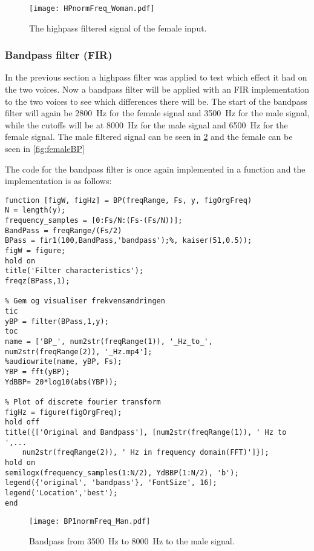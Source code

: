 \begin{figure}[h]
	\centering
	\texttt{[image: HPnormFreq\_Woman.pdf]}
	\caption{The highpass filtered signal of the female input.}
	\label{fig:HPFemale}
\end{figure}

\clearpage

\subsubsection{Bandpass filter (FIR)}
\label{sec:Bandpass}
In the previous section a highpass filter was applied to test which effect it had on the two voices. Now a bandpass filter will be applied with an FIR implementation to the two voices to see which differences there will be. The start of the bandpass filter will again be \SI{2800}{\hertz} for the female signal and \SI{3500}{\hertz} for the male signal, while the cutoffs will be at \SI{8000}{\hertz} for the male signal and \SI{6500}{\hertz} for the female signal. The male filtered signal can be seen in \cref{fig:maleBP} and the female can be seen in \cref{fig:femaleBP}

The code for the bandpass filter is once again implemented in a function and the implementation is as follows:

\begin{verbatim}
function [figW, figHz] = BP(freqRange, Fs, y, figOrgFreq)
N = length(y);
frequency_samples = [0:Fs/N:(Fs-(Fs/N))];
BandPass = freqRange/(Fs/2)
BPass = fir1(100,BandPass,'bandpass');%, kaiser(51,0.5));
figW = figure;
hold on
title('Filter characteristics');
freqz(BPass,1);

% Gem og visualiser frekvensændringen
tic
yBP = filter(BPass,1,y);
toc
name = ['BP_', num2str(freqRange(1)), '_Hz_to_', num2str(freqRange(2)), '_Hz.mp4'];
%audiowrite(name, yBP, Fs);
YBP = fft(yBP);
YdBBP= 20*log10(abs(YBP));

% Plot of discrete fourier transform
figHz = figure(figOrgFreq);
hold off
title({['Original and Bandpass'], [num2str(freqRange(1)), ' Hz to ',...
	num2str(freqRange(2)), ' Hz in frequency domain(FFT)']});
hold on
semilogx(frequency_samples(1:N/2), YdBBP(1:N/2), 'b');
legend({'original', 'bandpass'}, 'FontSize', 16);
legend('Location','best');
end
\end{verbatim}

\begin{figure}[h]
	\centering
	\texttt{[image: BP1normFreq\_Man.pdf]}
	\caption{Bandpass from \SI{3500}{\hertz} to \SI{8000}{\hertz} to the male signal.}
	\label{fig:maleBP}
\end{figure}

